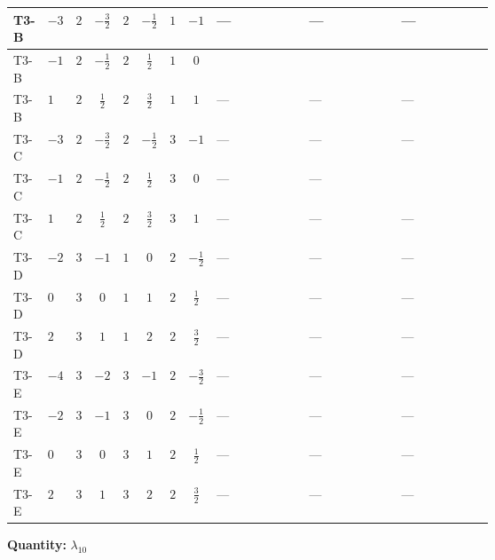\documentclass[8pt]{article}
\begin{document}
\begin{landscape}
\begin{longtable}{@{}llcccccc >{\raggedright\arraybackslash}p{0.21\linewidth} >{\raggedright\arraybackslash}p{0.21\linewidth} >{\raggedright\arraybackslash}p{0.21\linewidth}@{}}
\midrule
T3-B & $-3$ & $2$ & $-\frac{3}{2}$ & $2$ & $-\frac{1}{2}$ & $1$ & $-1$ & --- & --- & --- \\
\midrule
T3-B & $-1$ & $2$ & $-\frac{1}{2}$ & $2$ & $\frac{1}{2}$ & $1$ & $0$ & \scriptsize\adjustbox{max width=\linewidth}{$\begin{gathered} +{\lambda_{S_2}^{(1)}} (\operatorname{Tr}\!\left({y_2}\,\left({y_1}\right)^{\dagger}\right)+12 {\lambda_{10}})\end{gathered}$} & \scriptsize\adjustbox{max width=\linewidth}{$\begin{gathered} +{\lambda_{10}} (T_{\nu}^{(1)}+3 T_{\nu}^{(2)})\end{gathered}$} & \scriptsize\adjustbox{max width=\linewidth}{$\begin{gathered} -4 \operatorname{Tr}\!\left({y_2}\,\left({y_1}\right)^{\dagger}\,{y_2}\,\left({y_2}\right)^{\dagger}\right)\end{gathered}$} \\
\midrule
T3-B & $1$ & $2$ & $\frac{1}{2}$ & $2$ & $\frac{3}{2}$ & $1$ & $1$ & --- & --- & --- \\
\midrule
T3-C & $-3$ & $2$ & $-\frac{3}{2}$ & $2$ & $-\frac{1}{2}$ & $3$ & $-1$ & --- & --- & --- \\
\midrule
T3-C & $-1$ & $2$ & $-\frac{1}{2}$ & $2$ & $\frac{1}{2}$ & $3$ & $0$ & --- & --- & \scriptsize\adjustbox{max width=\linewidth}{$\begin{gathered} -5 \operatorname{Tr}\!\left({y_2}\,\left({y_1}\right)^{\dagger}\,{y_2}\,\left({y_2}\right)^{\dagger}\right)\end{gathered}$} \\
\midrule
T3-C & $1$ & $2$ & $\frac{1}{2}$ & $2$ & $\frac{3}{2}$ & $3$ & $1$ & --- & --- & --- \\
\midrule
T3-D & $-2$ & $3$ & $-1$ & $1$ & $0$ & $2$ & $-\frac{1}{2}$ & --- & --- & --- \\
\midrule
T3-D & $0$ & $3$ & $0$ & $1$ & $1$ & $2$ & $\frac{1}{2}$ & --- & --- & --- \\
\midrule
T3-D & $2$ & $3$ & $1$ & $1$ & $2$ & $2$ & $\frac{3}{2}$ & --- & --- & --- \\
\midrule
T3-E & $-4$ & $3$ & $-2$ & $3$ & $-1$ & $2$ & $-\frac{3}{2}$ & --- & --- & --- \\
\midrule
T3-E & $-2$ & $3$ & $-1$ & $3$ & $0$ & $2$ & $-\frac{1}{2}$ & --- & --- & --- \\
\midrule
T3-E & $0$ & $3$ & $0$ & $3$ & $1$ & $2$ & $\frac{1}{2}$ & --- & --- & --- \\
\midrule
T3-E & $2$ & $3$ & $1$ & $3$ & $2$ & $2$ & $\frac{3}{2}$ & --- & --- & --- \\
\midrule
\bottomrule
\end{longtable}
\clearpage
\noindent\textbf{Quantity: }$\lambda_{10}$\par\smallskip

\end{landscape}
\end{document}
